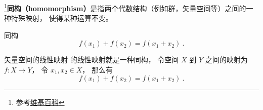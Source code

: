 
\begin{issues}
\end{issues}


\footnote{参考\href{https://en.wikipedia.org/wiki/Homomorphism}{维基百科}}\textbf{同构（homomorphism）}是指两个代数结构（例如群，矢量空间等）之间的一种特殊映射， 使得某种运算不变。

\begin{definition}{同构}
\begin{equation}
f(x_1) + f(x_2) = f(x_1 + x_2)~.
\end{equation}
\end{definition}

\begin{example}{矢量空间的线性映射}
的线性映射就是一种同构， 令空间 $X$ 到 $Y$ 之间的映射为 $f:X\to Y$， 令 $x_1, x_2\in X$， 那么有
\begin{equation}
f(x_1) + f(x_2) = f(x_1 + x_2)~.
\end{equation}
\end{example}
